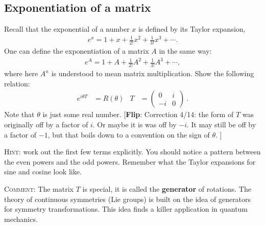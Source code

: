 \documentclass[12pt]{article}
\numberwithin{equation}{section}    %
\newcommand{\flip}[1]{{\color{red} [\textbf{Flip}: {#1}]}}
\begin{document}
\subsection{Exponentiation of a matrix}\label{sec:exponentiation}

Recall that the exponential of a number $x$ is defined by its Taylor expansion,
\begin{align}
	e^{x} = 1 + x + \frac{1}{2!}x^2 + \frac{1}{3!} x^3 + \cdots .
\end{align}
One can define the exponentiation of a matrix $A$ in the same way:
\begin{align}
	e^{A} = 1 + A + \frac{1}{2!}A^2 + \frac{1}{3!} A^3 + \cdots ,
\end{align}
where here $A^n$ is understood to mean matrix multiplication. Show the following relation:
\begin{align}
	e^{i \theta T} &= R(\theta) 
	&
		T &= \begin{pmatrix}
		0 & i \\ -i & 0
	\end{pmatrix}\ .
\end{align}
Note that $\theta$ is just some real number.  \flip{Correction 4/14: the form of $T$ was originally off by a factor of $i$. Or maybe it is was off by $-i$. It may still be off by a factor of $-1$, but that boils down to a convention on the sign of $\theta$. }

\textsc{Hint}: work out the first few terms explicitly. You should notice a pattern between the even powers and the odd powers. Remember what the Taylor expansions for sine and cosine look like. 

\textsc{Comment}: The matrix $T$ is special, it is called the \textbf{generator} of rotations. The theory of continuous symmetries (Lie groups) is built on the idea of generators for symmetry transformations. This idea finds a killer application in quantum mechanics.









\appendix	
\end{document}
